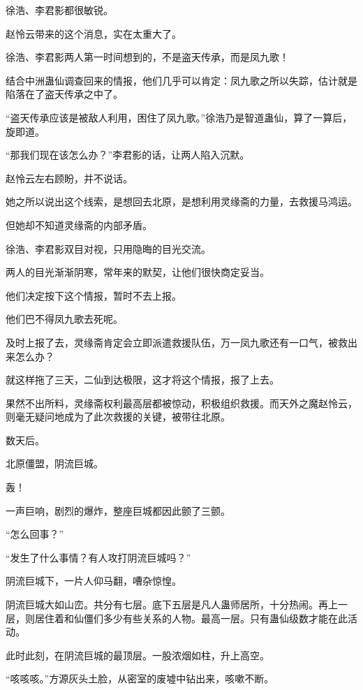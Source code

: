 
\begin{this_body}

徐浩、李君影都很敏锐。

赵怜云带来的这个消息，实在太重大了。

徐浩、李君影两人第一时间想到的，不是盗天传承，而是凤九歌！

结合中洲蛊仙调查回来的情报，他们几乎可以肯定：凤九歌之所以失踪，估计就是陷落在了盗天传承之中了。

“盗天传承应该是被敌人利用，困住了凤九歌。”徐浩乃是智道蛊仙，算了一算后，旋即道。

“那我们现在该怎么办？”李君影的话，让两人陷入沉默。

赵怜云左右顾盼，并不说话。

她之所以说出这个线索，是想回去北原，是想利用灵缘斋的力量，去救援马鸿运。

但她却不知道灵缘斋的内部矛盾。

徐浩、李君影双目对视，只用隐晦的目光交流。

两人的目光渐渐阴寒，常年来的默契，让他们很快商定妥当。

他们决定按下这个情报，暂时不去上报。

他们巴不得凤九歌去死呢。

及时上报了去，灵缘斋肯定会立即派遣救援队伍，万一凤九歌还有一口气，被救出来怎么办？

就这样拖了三天，二仙到达极限，这才将这个情报，报了上去。

果然不出所料，灵缘斋权利最高层都被惊动，积极组织救援。而天外之魔赵怜云，则毫无疑问地成为了此次救援的关键，被带往北原。

数天后。

北原僵盟，阴流巨城。

轰！

一声巨响，剧烈的爆炸，整座巨城都因此颤了三颤。

“怎么回事？”

“发生了什么事情？有人攻打阴流巨城吗？”

阴流巨城下，一片人仰马翻，嘈杂惊惶。

阴流巨城大如山峦。共分有七层。底下五层是凡人蛊师居所，十分热闹。再上一层，则居住着和仙僵们多少有些关系的人物。最高一层。只有蛊仙级数才能在此活动。

此时此刻，在阴流巨城的最顶层。一股浓烟如柱，升上高空。

“咳咳咳。”方源灰头土脸，从密室的废墟中钻出来，咳嗽不断。


\end{this_body}
